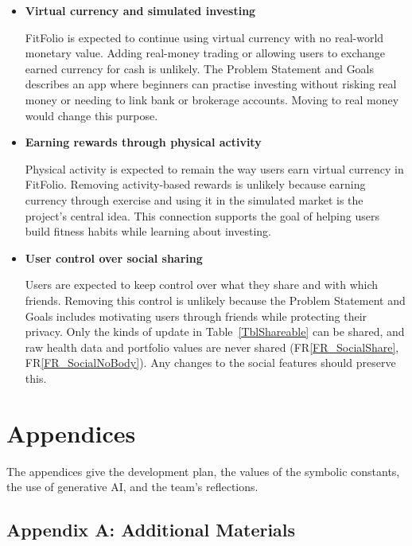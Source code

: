 \documentclass[12pt]{article}
\newcommand{\rref}[1]{FR\ref{#1}}
\newcounter{lcnum} %
\newcounter{ulcnum}
\begin{document}
\noindent \begin{itemize}
\item[ULC\refstepcounter{ulcnum}\theulcnum\label{ULC_firstChange}:]
\textbf{Virtual currency and simulated investing}

FitFolio is expected to continue using virtual currency with no real-world monetary value. Adding real-money trading or allowing users to exchange earned currency for cash is unlikely. The Problem Statement and Goals describes an app where beginners can practise investing without risking real money or needing to link bank or brokerage accounts. Moving to real money would change this purpose.

\item[ULC\refstepcounter{ulcnum}\theulcnum\label{ULC_SecondChange}:]
\textbf{Earning rewards through physical activity}

Physical activity is expected to remain the way users earn virtual currency in FitFolio. Removing activity-based rewards is unlikely because earning currency through exercise and using it in the simulated market is the project's central idea. This connection supports the goal of helping users build fitness habits while learning about investing. 

\item[ULC\refstepcounter{ulcnum}\theulcnum\label{ULC_thirdChange}:]
\textbf{User control over social sharing}

Users are expected to keep control over what they share and with which friends. Removing this control is unlikely because the Problem Statement and Goals includes motivating users through friends while protecting their privacy. Only the kinds of update in Table~\ref{TblShareable} can be shared, and raw health data and portfolio values are never shared (\rref{FR_SocialShare}, \rref{FR_SocialNoBody}). Any changes to the social features should preserve this.


\end{itemize}

\newpage{}

\section{Appendices}

The appendices give the development plan, the values of the symbolic
constants, the use of generative AI, and the team's reflections.

\subsection{Appendix A: Additional Materials}
\end{document}
